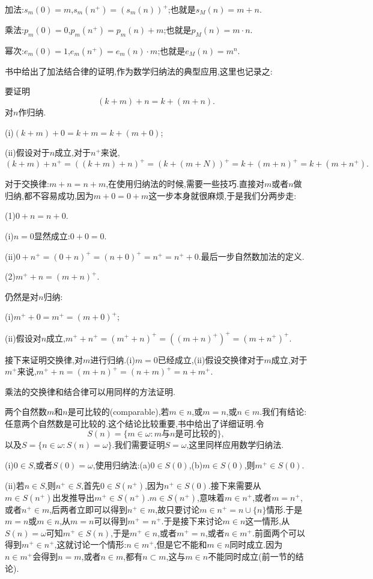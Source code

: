 \documentclass[12pt,a4paper,openany]{book}
\begin{document}
加法:$s_m(0)=m$,$s_m(n^+)=(s_m(n))^+$;也就是$s_M(n)=m+n$.

乘法:$p_m(0)=0$,$p_m(n^+)=p_m(n)+m$;也就是$p_M(n)=m \cdot n$.

幂次:$e_m(0)=1$,$e_m(n^+)=e_m(n) \cdot m$;也就是$e_M(n)=m^n$.

书中给出了加法结合律的证明,作为数学归纳法的典型应用,这里也记录之:

要证明
\[
(k+m)+n=k+(m+n).
\]
对$n$作归纳.

(i)$(k+m)+0=k+m=k+(m+0)$;

(ii)假设对于$n$成立,对于$n^+$来说,
\[
(k+m)+n^+ = ((k+m)+n)^+=(k+(m+N))^+=k+(m+n)^+=k+(m+n^+).
\]

对于交换律:$m+n=n+m$,在使用归纳法的时候,需要一些技巧.直接对$m$或者$n$做归纳,都不容易成功,因为$m+0=0+m$这一步本身就很麻烦,于是我们分两步走:

(1)$0+n=n+0$.

(i)$n=0$显然成立:$0+0=0$.

(ii)$0+n^+=(0+n)^+=(n+0)^+=n^+=n^++0$.最后一步自然数加法的定义.

(2)$m^++n=(m+n)^+$.

仍然是对$n$归纳:

(i)$m^++0=m^+=(m+0)^+$;

(ii)假设对$n$成立,$m^++n^+=(m^++n)^+=((m+n)^+)^+=(m+n^+)^+$.

接下来证明交换律,对$m$进行归纳.(i)$m=0$已经成立,(ii)假设交换律对于$m$成立,对于$m^+$来说,$m^++n=(m+n)^+=(n+m)^+=n+m^+$.

乘法的交换律和结合律可以用同样的方法证明.

两个自然数$m$和$n$是可比较的(comparable),若$m \in n$,或$m=n$,或$n \in m$.我们有结论:任意两个自然数是可比较的.这个结论比较重要,书中给出了详细证明.令
\[
S(n)=\{m \in \omega: m \text{与} n\text{是可比较的}\},
\]
以及$S = \{n \in \omega:S(n)=\omega\}$.我们需要证明$S=\omega$,这里同样应用数学归纳法.

(i)$0 \in S$,或者$S(0)=\omega$,使用归纳法:(a)$0 \in S(0)$,(b)$m \in S(0)$,则$m^+ \in S(0)$.

(ii)若$n \in S$,则$n^+ \in S$,首先$0 \in S(n^+)$,因为$n^+ \in S(0)$.接下来需要从$m \in S(n^+)$出发推导出$m^+ \in S(n^+)$.$m \in S(n^+)$,意味着$m \in n^+$,或者$m=n^+$,或者$n^+ \in m$,后两者立即可以得到$n^+ \in m$,故只要讨论$m \in n^+=n \cup \{n\}$情形.于是$m=n$或$m \in n$,从$m=n$可以得到$m^+=n^+$.于是接下来讨论$m \in n$这一情形,从$S(n)=\omega$可知$m^+ \in S(n)$,于是$m^+ \in n$,或者$m^+=n$,或者$n \in m^+$.前面两个可以得到$m^+ \in n^+$,这就讨论一个情形:$n \in m^+$,但是它不能和$m \in n$同时成立.因为$n \in m^+$会得到$n=m$,或者$n \in m$,都有$n \subset m$,这与$m \in n$不能同时成立(前一节的结论).
\end{document}
